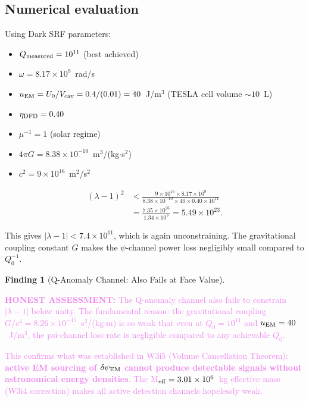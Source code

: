 \documentclass[11pt]{article}
\newcommand{\lam}{\lambda}
\newcommand{\lbone}{|\lambda - 1|}
\newcommand{\ee}[1]{\times 10^{#1}}
\newcommand{\dpsiEM}{\delta\psi_{\rm EM}}
\newcommand{\honest}[1]{\textcolor{violet}{\textbf{HONEST ASSESSMENT:} #1}}
\theoremstyle{definition}
\newtheorem{finding}[theorem]{Finding}
\theoremstyle{remark}
\begin{document}
\subsection{Numerical evaluation}

Using Dark SRF parameters:
\begin{itemize}[nosep]
\item $Q_{\rm measured} = 10^{11}$ (best achieved)
\item $\omega = 8.17\ee{9}$~rad/s
\item $u_{\rm EM} = U_0/V_{\rm cav} = 0.4/(0.01) = 40$~J/m$^3$
  (TESLA cell volume $\sim 10$~L)
\item $\eta_{\rm DFD} = 0.40$
\item $\mu^{-1} = 1$ (solar regime)
\item $4\pi G = 8.38\ee{-10}$~m$^3$/(kg$\cdot$s$^2$)
\item $c^2 = 9\ee{16}$~m$^2$/s$^2$
\end{itemize}

\begin{align}
(\lam-1)^2 &< \frac{9\ee{16}\times 8.17\ee{9}}
{8.38\ee{-10}\times 40\times 0.40\times 10^{11}} \nonumber\\
&= \frac{7.35\ee{26}}{1.34\ee{3}} = 5.49\ee{23}.
\label{eq:Q_bound_numerical_attempt}
\end{align}

This gives $\lbone < 7.4\ee{11}$, which is again unconstraining.
The gravitational coupling constant $G$ makes the $\psi$-channel
power loss negligibly small compared to $Q_0^{-1}$.

\begin{finding}[Q-Anomaly Channel: Also Fails at Face Value]
\label{find:q_anomaly_fails}
\honest{The Q-anomaly channel also fails to constrain $\lbone$ below
unity. The fundamental reason: the gravitational coupling
$G/c^4 = 8.26\ee{-45}$~s$^2$/(kg$\cdot$m) is so weak that even at
$Q_0 = 10^{11}$ and $u_{\rm EM} = 40$~J/m$^3$, the psi-channel loss
rate is negligible compared to any achievable $Q_0$.

This confirms what was established in W3i5 (Volume Cancellation Theorem):
\textbf{active EM sourcing of $\dpsiEM$ cannot produce detectable
signals without astronomical energy densities}. The M$_{\rm eff} = 3.01
\ee{6}$~kg effective mass (W3i4 correction) makes all active detection
channels hopelessly weak.}
\end{finding}


\end{document}
